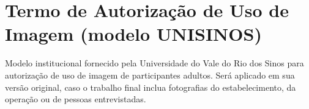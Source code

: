 \chapter{Termo de Autorização de Uso de Imagem (modelo UNISINOS)}
\label{an:uso-imagem}

Modelo institucional fornecido pela Universidade do Vale do Rio dos Sinos para autorização de uso de imagem de participantes adultos. Será aplicado em sua versão original, caso o trabalho final inclua fotografias do estabelecimento, da operação ou de pessoas entrevistadas.



